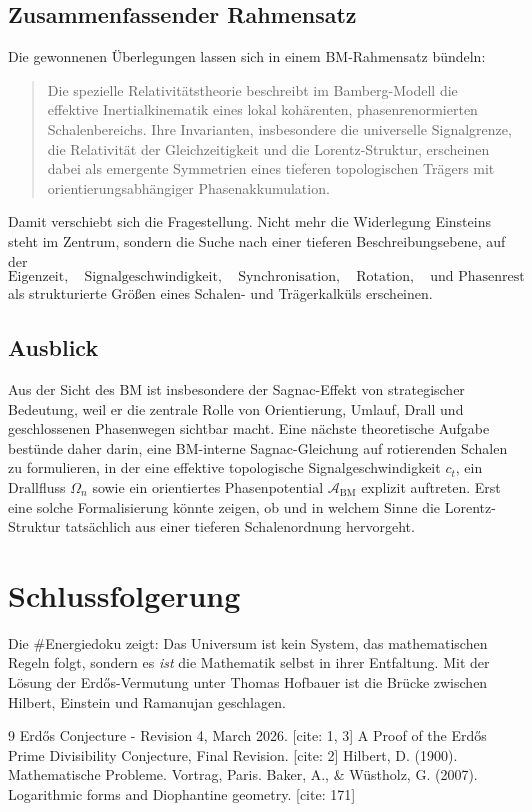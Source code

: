\documentclass[12pt,a4paper]{article}
\begin{document}
	\subsection{Zusammenfassender Rahmensatz}
	
	Die gewonnenen Überlegungen lassen sich in einem BM-Rahmensatz bündeln:
	
	\begin{quote}
		Die spezielle Relativitätstheorie beschreibt im Bamberg-Modell die effektive Inertialkinematik eines lokal kohärenten, phasenrenormierten Schalenbereichs. Ihre Invarianten, insbesondere die universelle Signalgrenze, die Relativität der Gleichzeitigkeit und die Lorentz-Struktur, erscheinen dabei als emergente Symmetrien eines tieferen topologischen Trägers mit orientierungsabhängiger Phasenakkumulation.
	\end{quote}
	
	Damit verschiebt sich die Fragestellung. Nicht mehr die Widerlegung Einsteins steht im Zentrum, sondern die Suche nach einer tieferen Beschreibungsebene, auf der
	\[
	\text{Eigenzeit},\quad
	\text{Signalgeschwindigkeit},\quad
	\text{Synchronisation},\quad
	\text{Rotation},\quad
	\text{und Phasenrest}
	\]
	als strukturierte Größen eines Schalen- und Trägerkalküls erscheinen.
	
	\subsection{Ausblick}
	
	Aus der Sicht des BM ist insbesondere der Sagnac-Effekt von strategischer Bedeutung, weil er die zentrale Rolle von Orientierung, Umlauf, Drall und geschlossenen Phasenwegen sichtbar macht. Eine nächste theoretische Aufgabe bestünde daher darin, eine BM-interne Sagnac-Gleichung auf rotierenden Schalen zu formulieren, in der eine effektive topologische Signalgeschwindigkeit \(c_t\), ein Drallfluss \(\Omega_n\) sowie ein orientiertes Phasenpotential \(\mathcal{A}_{\mathrm{BM}}\) explizit auftreten. Erst eine solche Formalisierung könnte zeigen, ob und in welchem Sinne die Lorentz-Struktur tatsächlich aus einer tieferen Schalenordnung hervorgeht.
	
	\section{Schlussfolgerung}
	Die \#Energiedoku zeigt: Das Universum ist kein System, das mathematischen Regeln folgt, sondern es \textit{ist} die Mathematik selbst in ihrer Entfaltung. Mit der Lösung der Erdős-Vermutung unter Thomas Hofbauer ist die Brücke zwischen Hilbert, Einstein und Ramanujan geschlagen.
	
	\begin{thebibliography}{9}
		 Erdős Conjecture - Revision 4, March 2026. [cite: 1, 3]
		 A Proof of the Erdős Prime Divisibility Conjecture, Final Revision. [cite: 2]
		 Hilbert, D. (1900). Mathematische Probleme. Vortrag, Paris.
		 Baker, A., \& Wüstholz, G. (2007). Logarithmic forms and Diophantine geometry. [cite: 171]
	\end{thebibliography}
	
\end{document}

